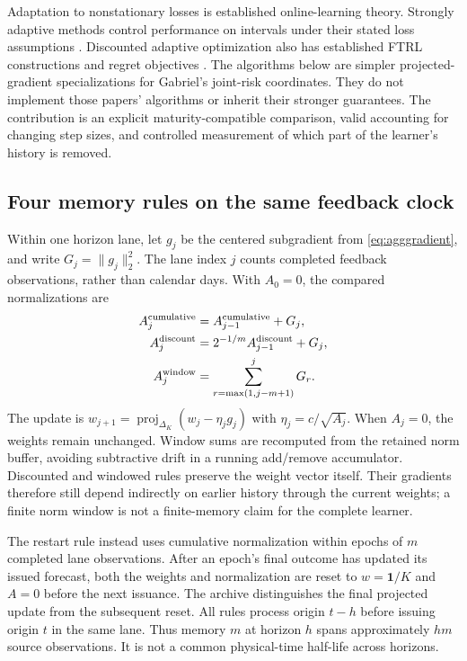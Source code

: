 \documentclass[11pt,a4paper]{article}
\theoremstyle{definition}\newtheorem{definition}[theorem]{Definition}
\begin{document}
Adaptation to nonstationary losses is established online-learning theory. Strongly adaptive methods control performance on intervals under their stated loss assumptions \cite{daniely2015strongly}. Discounted adaptive optimization also has established FTRL constructions and regret objectives \cite{zhang2024discounted}. The algorithms below are simpler projected-gradient specializations for Gabriel's joint-risk coordinates. They do not implement those papers' algorithms or inherit their stronger guarantees. The contribution is an explicit maturity-compatible comparison, valid accounting for changing step sizes, and controlled measurement of which part of the learner's history is removed.

\subsection{Four memory rules on the same feedback clock}
Within one horizon lane, let $g_j$ be the centered subgradient from \eqref{eq:agggradient}, and write $G_j=\|g_j\|_2^2$. The lane index $j$ counts completed feedback observations, rather than calendar days. With $A_0=0$, the compared normalizations are
\begin{align}
 A_j^{\rm cumulative}&=A_{j-1}^{\rm cumulative}+G_j,\\
 A_j^{\rm discount}&=2^{-1/m}A_{j-1}^{\rm discount}+G_j,\\
 A_j^{\rm window}&=\sum_{r=\max(1,j-m+1)}^jG_r.
 \label{eq:forgetnormalizers}
\end{align}
The update is $w_{j+1}=\operatorname{proj}_{\Delta_K}(w_j-\eta_jg_j)$ with $\eta_j=c/\sqrt{A_j}$. When $A_j=0$, the weights remain unchanged. Window sums are recomputed from the retained norm buffer, avoiding subtractive drift in a running add/remove accumulator. Discounted and windowed rules preserve the weight vector itself. Their gradients therefore still depend indirectly on earlier history through the current weights; a finite norm window is not a finite-memory claim for the complete learner.

The restart rule instead uses cumulative normalization within epochs of $m$ completed lane observations. After an epoch's final outcome has updated its issued forecast, both the weights and normalization are reset to $w=\boldsymbol1/K$ and $A=0$ before the next issuance. The archive distinguishes the final projected update from the subsequent reset. All rules process origin $t-h$ before issuing origin $t$ in the same lane. Thus memory $m$ at horizon $h$ spans approximately $hm$ source observations. It is not a common physical-time half-life across horizons.
\end{document}
